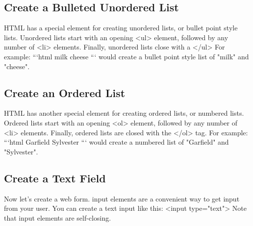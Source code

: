 \documentclass{article}%
\begin{document}
%
\subsection{Create a Bulleted Unordered List}%
\label{subsec:CreateaBulletedUnorderedList}%
HTML has a special element for creating unordered lists, or bullet point style lists.\newline%
Unordered lists start with an opening <ul> element, followed by any number of <li> elements. Finally, unordered lists close with a </ul>\newline%
For example:\newline%
```html\newline%
milk\newline%
cheese\newline%
```\newline%
would create a bullet point style list of "milk" and "cheese".\newline%

%
\subsection{Create an Ordered List}%
\label{subsec:CreateanOrderedList}%
HTML has another special element for creating ordered lists, or numbered lists.\newline%
Ordered lists start with an opening <ol> element, followed by any number of <li> elements. Finally, ordered lists are closed with the </ol> tag.\newline%
For example:\newline%
```html\newline%
Garfield\newline%
Sylvester\newline%
```\newline%
would create a numbered list of "Garfield" and "Sylvester".\newline%

%
\subsection{Create a Text Field}%
\label{subsec:CreateaTextField}%
Now let's create a web form.\newline%
input elements are a convenient way to get input from your user.\newline%
You can create a text input like this:\newline%
<input type="text">\newline%
Note that input elements are self{-}closing.\newline%
\end{document}
